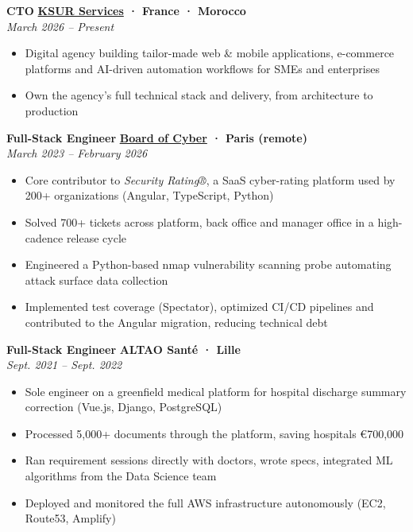\documentclass[a4paper,11pt]{article}
\newcommand{\expdivider}{\vspace{0.01cm}\noindent{\color{light!60!gray}\rule{\linewidth}{0.4pt}}\vspace{0.01cm}}
\begin{document}
\expdivider

\noindent\textbf{CTO} \hfill \textbf{\href{https://www.agence-ksur.com}{KSUR Services} · France · Morocco} \\
\textit{March 2026 – Present}
\begin{itemize}[nosep]
    \item Digital agency building tailor-made web \& mobile applications, e-commerce platforms and AI-driven automation workflows for SMEs and enterprises
    \item Own the agency's full technical stack and delivery, from architecture to production
\end{itemize}

\expdivider

\noindent\textbf{Full-Stack Engineer} \hfill \textbf{\href{https://www.boardofcyber.io}{Board of Cyber} · Paris (remote)} \\
\textit{March 2023 – February 2026}
\begin{itemize}[nosep]
    \item Core contributor to \textit{Security Rating®}, a SaaS cyber-rating platform used by 200+ organizations (Angular, TypeScript, Python)
    \item Solved 700+ tickets across platform, back office and manager office in a high-cadence release cycle
    \item Engineered a Python-based nmap vulnerability scanning probe automating attack surface data collection
    \item Implemented test coverage (Spectator), optimized CI/CD pipelines and contributed to the Angular migration, reducing technical debt
\end{itemize}

\expdivider

\noindent\textbf{Full-Stack Engineer} \hfill \textbf{ALTAO Santé · Lille} \\
\textit{Sept. 2021 – Sept. 2022}
\begin{itemize}[nosep]
    \item Sole engineer on a greenfield medical platform for hospital discharge summary correction (Vue.js, Django, PostgreSQL)
    \item Processed 5,000+ documents through the platform, saving hospitals €700,000
    \item Ran requirement sessions directly with doctors, wrote specs, integrated ML algorithms from the Data Science team
    \item Deployed and monitored the full AWS infrastructure autonomously (EC2, Route53, Amplify)
\end{itemize}
\end{document}
